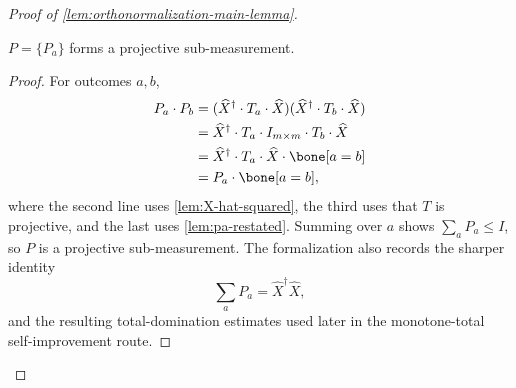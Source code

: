 \begin{proof}[Proof of \ref{lem:orthonormalization-main-lemma}]
	\begin{lemma}[Projectivity of~$P$]\label{lem:P-projectivity}
		\leanok
		$P = \{P_a\}$ forms a projective sub-measurement.
	\end{lemma}
	\begin{proof}
		\leanok
		For outcomes $a,b$,
		\begin{align*}
			P_a \cdot P_b
			 & =
			(\widehat{X}^\dagger \cdot T_a \cdot \widehat{X})
			(\widehat{X}^\dagger \cdot T_b \cdot \widehat{X})                              \\
			 & =
			\widehat{X}^\dagger \cdot T_a \cdot I_{m \times m} \cdot T_b \cdot \widehat{X} \\
			 & =
			\widehat{X}^\dagger \cdot T_a \cdot \widehat{X} \cdot \bone[a=b]               \\
			 & =
			P_a \cdot \bone[a=b],
		\end{align*}
		where the second line uses \ref{lem:X-hat-squared}, the third uses that $T$ is projective, and the last uses \ref{lem:pa-restated}. Summing over $a$ shows $\sum_a P_a \leq I$, so $P$ is a projective sub-measurement.  The formalization also records the sharper identity
		\[
			\sum_a P_a=\widehat X^\dagger\widehat X,
		\]
		and the resulting total-domination estimates used later in the monotone-total self-improvement route.
	\end{proof}


\end{proof}
